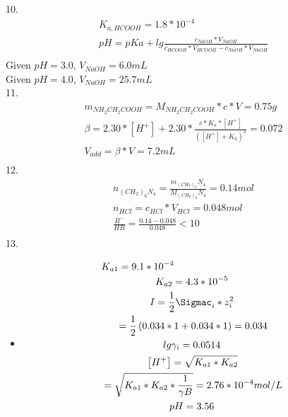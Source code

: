 \documentclass{article}
\begin{document}
10. \begin{equation}
    \begin{multlined}
        K_{a, HCOOH} = 1.8*10^{-4}\\
        pH = pKa + lg\frac{c_{NaOH}*V_{NaOH}}{c_{HCOOH}*V_{HCOOH} - c_{NaOH}*V_{NaOH}}\\
    \end{multlined}
\end{equation}
Given $pH = 3.0$, $V_{NaOH} = 6.0mL$\\
Given $pH = 4.0$, $V_{NaOH} = 25.7mL$\\
11. \begin{equation}
    \begin{multlined}
        m_{NH_2CH_2COOH} = M_{NH_2CH_2COOH} * c * V = 0.75g\\
        \beta = 2.30*\left[H^+\right]+2.30*\frac{c*K_a*\left[H^+\right]}{\left(\left[H^+\right]+K_a\right)^2} = 0.072\\
        V_{add} = \beta * V = 7.2 mL\\
    \end{multlined}
\end{equation}
12. \begin{equation}
    \begin{multlined}
        n_{\left(CH_2\right)_6N_4} = \frac{m_\left(CH_2\right)_6N_4}{M_\left(CH_2\right)_6N_4} = 0.14 mol\\
        n_{HCl} = c_{HCl}*V_{HCl} = 0.048mol\\
        \frac{B^-}{HB} = \frac{0.14 - 0.048}{0.048} < 10\\
    \end{multlined}
\end{equation}
13. \begin{itemize}
    \item 
    \begin{equation}
        \begin{multlined}
            K_{a1} = 9.1*10^{-4}\\
            K_{a2} = 4.3*10^{-5}\\
            I = \frac{1}{2}\Sigmac_i*z_i^2\\
            =\frac{1}{2}\left(0.034*1+0.034*1\right)
            =0.034\\
            lg\gamma_i = 0.0514\\
            \left[H^+\right] = \sqrt{K_{a1}*K_{a2}}\\
            =\sqrt{K_{a1}*K_{a2}*\frac{1}{\gamma B}} = 2.76*10^{-4} mol/L\\
            pH = 3.56\\
        \end{multlined}
    \end{equation}
\end{itemize}
\end{document}
